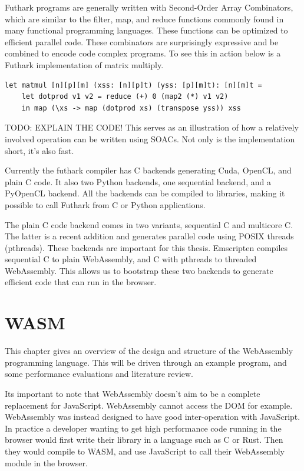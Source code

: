 \documentclass[11pt]{book}
\begin{document}
Futhark programs are generally written with Second-Order Array Combinators, which are similar to the filter, map, and reduce functions commonly found in many functional programming languages. These functions can be optimized to efficient parallel code. These combinators are surprisingly expressive and be combined to encode code complex programs. To see this in action below is a Futhark implementation of matrix multiply.

\begin{verbatim}
let matmul [n][p][m] (xss: [n][p]t) (yss: [p][m]t): [n][m]t =
    let dotprod v1 v2 = reduce (+) 0 (map2 (*) v1 v2)
    in map (\xs -> map (dotprod xs) (transpose yss)) xss
\end{verbatim}
TODO: EXPLAIN THE CODE!
This serves as an illustration of how a relatively involved operation can be written using SOACs. Not only is the implementation short, it's also fast.

Currently the futhark compiler has C backends generating Cuda, OpenCL, and plain C code. It also two Python backends, one sequential backend, and a PyOpenCL backend. All the backends can be compiled to libraries, making it possible to call Futhark from C or Python applications. 

The plain C code backend comes in two variants, sequential C and multicore C. The latter is a recent addition and generates parallel code using POSIX threads (pthreads). These backends are important for this thesis. Emscripten compiles sequential C to plain WebAssembly, and C with pthreads to threaded WebAssembly. This allows us to bootstrap these two backends to generate efficient code that can run in the browser. 


\chapter{WASM}
This chapter gives an overview of the design and structure of the WebAssembly programming language. This will be driven through an example program, and some performance evaluations and literature review. 



Its important to note that WebAssembly doesn't aim to be a complete replacement for JavaScript. WebAssembly cannot access the DOM for example. WebAssembly was instead designed to have good inter-operation with JavaScript. In practice a developer wanting to get high performance code running in the browser would first write their library in a language such as C or Rust. Then they would compile to WASM, and use JavaScript to call their WebAssembly module in the browser. 
\end{document}
